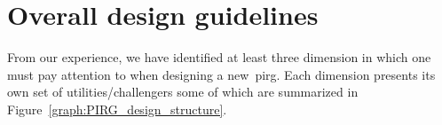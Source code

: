 





\section{Overall design guidelines}\label{sec:dimensions}
From our experience, we have identified at least three dimension in which one must pay attention to when designing a new~\gls{pirg}. Each dimension presents its own set of utilities/challengers some of which are summarized in Figure~\ref{graph:PIRG_design_structure}. 


